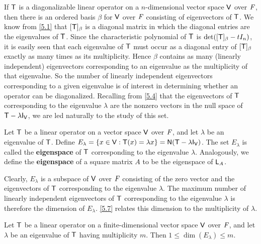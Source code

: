 \begin{note}
	If \(\mathsf{T}\) is a diagonalizable linear operator on a \(n\)-dimensional vector space \(\mathsf{V}\) over \(\mathit{F}\), then there is an ordered basis \(\beta\) for \(\mathsf{V}\) over \(\mathit{F}\) consisting of eigenvectors of \(\mathsf{T}\).
	We know from \cref{5.1} that \([\mathsf{T}]_{\beta}\) is a diagonal matrix in which the diagonal entries are the eigenvalues of \(\mathsf{T}\).
	Since the characteristic polynomial of \(\mathsf{T}\) is \(\det([\mathsf{T}]_{\beta} - t I_n)\), it is easily seen that each eigenvalue of \(\mathsf{T}\) must occur as a diagonal entry of \([\mathsf{T}]_{\beta}\) exactly as many times as its multiplicity.
	Hence \(\beta\) contains as many (linearly independent) eigenvectors corresponding to an eigenvalue as the multiplicity of that eigenvalue.
	So the number of linearly independent eigenvectors corresponding to a given eigenvalue is of interest in determining whether an operator can be diagonalized.
	Recalling from \cref{5.4} that the eigenvectors of \(\mathsf{T}\) corresponding to the eigenvalue \(\lambda\) are the nonzero vectors in the null space of \(\T - \lambda \IT[\V]\), we are led naturally to the study of this set.
\end{note}

\begin{defn}\label{5.2.4}
	Let \(\mathsf{T}\) be a linear operator on a vector space \(\mathsf{V}\) over \(\mathit{F}\), and let \(\lambda\) be an eigenvalue of \(\mathsf{T}\).
	Define \(E_\lambda = \set{x \in \V : \T(x) = \lambda x} = \ns{\T - \lambda \IT[\V]}\).
	The set \(E_\lambda\) is called the \textbf{eigenspace} of \(\mathsf{T}\) corresponding to the eigenvalue \(\lambda\).
	Analogously, we define the \textbf{eigenspace} of a square matrix \(A\) to be the eigenspace of \(\mathsf{L}_A\).
\end{defn}

\begin{note}
	Clearly, \(E_{\lambda}\) is a subspace of \(\mathsf{V}\) over \(\mathit{F}\) consisting of the zero vector and the eigenvectors of \(\mathsf{T}\) corresponding to the eigenvalue \(\lambda\).
	The maximum number of linearly independent eigenvectors of \(\mathsf{T}\) corresponding to the eigenvalue \(\lambda\) is therefore the dimension of \(E_{\lambda}\).
	\cref{5.7} relates this dimension to the multiplicity of \(\lambda\).
\end{note}

\begin{thm}\label{5.7}
	Let \(\mathsf{T}\) be a linear operator on a finite-dimensional vector space \(\mathsf{V}\) over \(\mathit{F}\), and let \(\lambda\) be an eigenvalue of \(\mathsf{T}\) having multiplicity \(m\).
	Then \(1 \leq \dim(E_{\lambda}) \leq m\).
\end{thm}


